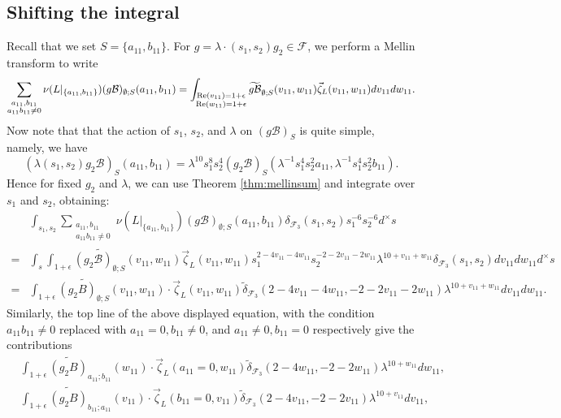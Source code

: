 \documentclass{article}
\def\Re{{\rm Re}}
\def\cB{{\mathcal B}}
\def\FF{{\mathcal F}}
\def\wt{\widetilde}
\begin{document}
\subsection{Shifting the integral}

Recall that we set $S=\{a_{11},b_{11}\}$. For $g=\lambda\cdot (s_1,s_2)g_2\in\FF$, we perform a Mellin transform to write
\begin{equation*}
\sum_{\substack{a_{11},b_{11}\\a_{11}b_{11}\neq 0}}\nu(L|_{\{a_{11},b_{11}\}})(g\cB)_{\emptyset;S}(a_{11},b_{11})
=\int_{\substack{\Re(v_{11})=1+\epsilon\\\Re(w_{11})=1+\epsilon}}\wt{g\cB}_{\emptyset;S}(v_{11},w_{11})\vec{\zeta}_L(v_{11},w_{11})dv_{11}dw_{11}.
\end{equation*}
Now note that that the action of $s_1$, $s_2$, and $\lambda$ on $(g\cB)_S$ is quite simple, namely, we have 
\begin{equation*}
(\lambda(s_1,s_2)g_2\cB)_S(a_{11},b_{11})=\lambda^{10}s_1^8s_2^4(g_2\cB)_S(\lambda^{-1}s_1^{4}s_2^{2}a_{11},\lambda^{-1}s_1^{4}s_2^{2}b_{11}).
\end{equation*}
Hence for fixed $g_2$ and $\lambda$, we can use Theorem \ref{thm:mellinsum} and integrate over $s_1$ and $s_2$, obtaining:
\begin{equation}\label{eq:t_small_shift_main}
\begin{array}{ll}
&\displaystyle \int_{s_1,s_2}\sum_{\substack{a_{11},b_{11}\\a_{11}b_{11}\neq 0}}\nu(L|_{\{a_{11},b_{11}\}})(g\cB)_{\emptyset;S}(a_{11},b_{11})
\delta_{\FF_3}(s_1,s_2)s_1^{-6}s_2^{-6}d^\times s
\\[.2in]
= & \displaystyle\int_{s}\int_{1+\epsilon} \wt{(g_2\cB)_{\emptyset;S}}
(v_{11},w_{11})\vec{\zeta}_L(v_{11},w_{11})s_1^{2-4v_{11}-4w_{11}}s_2^{-2-2v_{11}-2w_{11}}\lambda^{10+v_{11}+w_{11}}
\displaystyle \delta_{\FF_3}(s_1,s_2) dv_{11}dw_{11}d^\times s
\\[.2in]
= &\displaystyle
\int_{1+\epsilon}\widetilde{(g_2B)_{\emptyset;S}}(v_{11},w_{11})\cdot\vec{\zeta}_L(v_{11},w_{11})\tilde{\delta}_{\FF_3}(2-4v_{11}-4w_{11},-2-2v_{11}-2w_{11})\lambda^{10+v_{11}+w_{11}}dv_{11}dw_{11}.
\end{array}
\end{equation}
Similarly, the top line of the above displayed equation, with the condition $a_{11}b_{11}\neq 0$ replaced with $a_{11}=0,b_{11}\neq 0$, and $a_{11}\neq 0,b_{11}= 0$ respectively give the contributions
\begin{equation}\label{eq:t_small_a11b11_0_contribs}
\begin{array}{rcl}
&\displaystyle\int_{1+\epsilon}\widetilde{(g_2B)}_{a_{11};b_{11}}(w_{11})\cdot\vec{\zeta}_L(a_{11}=0,w_{11})\wt{\delta}_{\FF_3}(2-4w_{11},-2-2w_{11})\lambda^{10+w_{11}}dw_{11},
\\[.2in]
&\displaystyle\int_{1+\epsilon}\widetilde{(g_2B)}_{b_{11};a_{11}}(v_{11})\cdot\vec{\zeta}_L(b_{11}=0,v_{11})\wt{\delta}_{\FF_3}(2-4v_{11},-2-2v_{11})\lambda^{10+v_{11}}dv_{11},
\end{array}
\end{equation}
\end{document}

